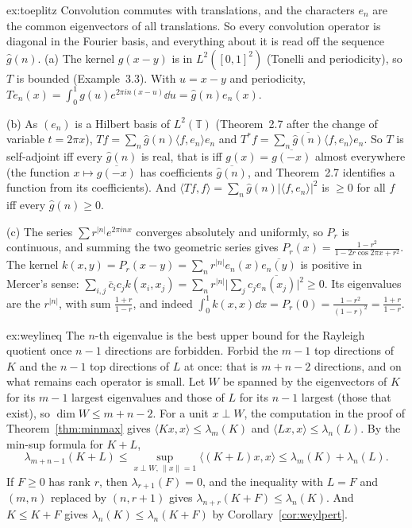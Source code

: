 \begin{solution}{ex:toeplitz}
\idea Convolution commutes with translations, and the characters $e_n$ are the common eigenvectors of all translations. So every convolution operator is diagonal in the Fourier basis, and everything about it is read off
the sequence $\hat g(n)$.
\writeup (a) The kernel $g(x-y)$ is in $L^2([0,1]^2)$ (Tonelli and periodicity), so $T$ is bounded (Example~3.3). With $u=x-y$ and periodicity, $Te_n(x)=\int_0^1g(u)e^{2\pi in(x-u)}\dd u=\hat g(n)e_n(x)$.

(b) As $(e_n)$ is a Hilbert basis of $L^2(\mathbb T)$ (Theorem~2.7 after the change of variable $t=2\pi x$), $Tf=\sum_n\hat g(n)\langle f,e_n\rangle e_n$ and $T^*f=\sum_n\overline{\hat g(n)}\langle f,e_n\rangle e_n$. So $T$ is self-adjoint iff
every $\hat g(n)$ is real, that is iff $g(x)=\overline{g(-x)}$ almost everywhere (the function $x\mapsto\overline{g(-x)}$ has coefficients $\overline{\hat g(n)}$, and Theorem~2.7 identifies a function from its coefficients).
And $\langle Tf,f\rangle=\sum_n\hat g(n)|\langle f,e_n\rangle|^2$ is $\ge0$ for all $f$ iff every $\hat g(n)\ge0$.

(c) The series $\sum r^{|n|}e^{2\pi inx}$ converges absolutely and uniformly, so $P_r$ is continuous, and summing the two geometric series gives $P_r(x)=\frac{1-r^2}{1-2r\cos2\pi x+r^2}$. The kernel $k(x,y)=P_r(x-y)=\sum_nr^{|n|}e_n(x)\overline{e_n(y)}$
is positive in Mercer's sense: $\sum_{i,j}\bar c_ic_jk(x_i,x_j)=\sum_nr^{|n|}\bigl|\sum_jc_j\overline{e_n(x_j)}\bigr|^2\ge0$. Its eigenvalues are the $r^{|n|}$, with sum $\frac{1+r}{1-r}$, and indeed
$\int_0^1k(x,x)\dd x=P_r(0)=\frac{1-r^2}{(1-r)^2}=\frac{1+r}{1-r}$.
\end{solution}

\begin{solution}{ex:weylineq}
\idea The $n$-th eigenvalue is the best upper bound for the Rayleigh quotient once $n-1$ directions are forbidden. Forbid the $m-1$ top directions of $K$ and the $n-1$ top directions of $L$ at once: that is $m+n-2$
directions, and on what remains each operator is small.
\writeup Let $W$ be spanned by the eigenvectors of $K$ for its $m-1$ largest eigenvalues and those of $L$ for its $n-1$ largest (those that exist), so $\dim W\le m+n-2$. For a unit $x\perp W$, the computation in the
proof of Theorem~\ref{thm:minmax} gives $\langle Kx,x\rangle\le\lambda_m(K)$ and $\langle Lx,x\rangle\le\lambda_n(L)$. By the min-sup formula for $K+L$,
\[\lambda_{m+n-1}(K+L)\le\sup_{x\perp W,\,\|x\|=1}\langle(K+L)x,x\rangle\le\lambda_m(K)+\lambda_n(L).\]
If $F\ge0$ has rank $r$, then $\lambda_{r+1}(F)=0$, and the inequality with $L=F$ and $(m,n)$ replaced by $(n,r+1)$ gives $\lambda_{n+r}(K+F)\le\lambda_n(K)$. And $K\le K+F$ gives $\lambda_n(K)\le\lambda_n(K+F)$ by
Corollary~\ref{cor:weylpert}.
\end{solution}

